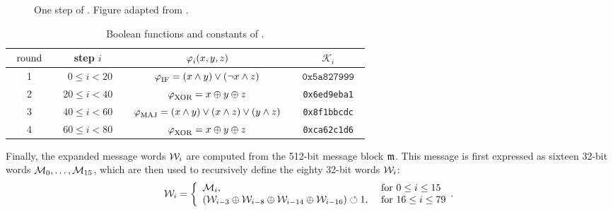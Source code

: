 \begin{figure}[ht]
\begin{center}

\caption[One step of \shaone.]{One step of \shaone. Figure adapted from \cite{TiKZ:Cryptographers}.\label{fig:sha1_step}}
\end{center}
\end{figure}


\renewcommand{\arraystretch}{1.2}
\begin{table}[ht]
\caption{\label{tab:sha_spec}Boolean functions and constants of \shaone.}
\begin{center}
\begin{tabular}{c c c c} \toprule
$\;\; \textnormal{round} \;\;$ & step $i$ & $\operatorname{\varphi}_i(x,y,z)$ &  $\mathcal{K}_i$ \\ \midrule
1 & $\;\;  \:\:0 \leq i <  20 \;\;$  & $\operatorname{\varphi}_{\text{IF}} = (x \wedge y) \vee (\neg x \wedge z)$ & $\;\; \texttt{0x5a827999} \;\;$ \\
2 & $20 \leq i <  40$ & $\operatorname{\varphi}_{\text{XOR}} = x \oplus y \oplus z$ & \texttt{0x6ed9eba1} \\
3 & $40 \leq i <  60$ & $\;\;  \operatorname{\varphi}_{\text{MAJ}} = (x \wedge y) \vee (x \wedge z) \vee (y \wedge z) \;\;$  & \texttt{0x8f1bbcdc} \\
4 & $60 \leq i <  80$ & $\operatorname{\varphi}_{\text{XOR}} = x \oplus y \oplus z $ & \texttt{0xca62c1d6} \\
\bottomrule
\end{tabular}
\end{center}
\end{table}

\noindent
Finally, the expanded message words $\mathcal{W}_i$ are computed from the 512-bit message block $\mathfrak{m}$. This message is first expressed as
sixteen 32-bit words $\mathcal{M}_0,\ldots, \mathcal{M}_{15}$, which are then used to recursively define the eighty 32-bit words $\mathcal{W}_i$:
\begin{equation}
\label{eq:exp_mess}
\mathcal{W}_i=
\left\{
\begin{array}{ll}
\mathcal{M}_i, & \textnormal{ for } 0\leq i\leq 15 \\
(\mathcal{W}_{i-3} \oplus \mathcal{W}_{i-8} \oplus \mathcal{W}_{i-14} \oplus \mathcal{W}_{i-16}) \circlearrowleft 1, & \textnormal{ for } 16\leq i\leq 79
\end{array}.
\right.
\end{equation}

